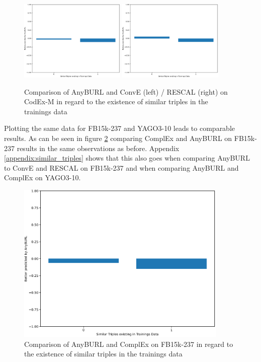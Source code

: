 \begin{figure}[H]
\centering
\includegraphics[width=0.45\textwidth]{images/similar_triples_binary_anyburl_conve_codex.PNG}
\includegraphics[width=0.45\textwidth]{images/similar_triples_binary_anyburl_rescal_codex.PNG}
\caption{Comparison of AnyBURL and ConvE (left) / RESCAL (right) on CodEx-M in regard to the existence of similar triples in the trainings data}
\label{fig:similar_triples_binary_anyburl_conve_rescal_codex}
\end{figure}

Plotting the same data for FB15k-237 and YAGO3-10 leads to comparable results. As can be seen in figure \ref{fig:similar_triples_binary_anyburl_complex_fb15k} comparing ComplEx and AnyBURL on FB15k-237 results in the same observations as before. Appendix \ref{appendix:similar_triples} shows that this also goes when comparing AnyBURL to ConvE and RESCAL on FB15k-237 and when comparing AnyBURL and ComplEx on YAGO3-10.

\begin{figure}[H]
\centering
\includegraphics[width=0.9\textwidth]{images/similar_triples_binary_anyburl_complex_fb15k.PNG}
\caption{Comparison of AnyBURL and ComplEx on FB15k-237 in regard to the existence of similar triples in the trainings data}
\label{fig:similar_triples_binary_anyburl_complex_fb15k}
\end{figure}

